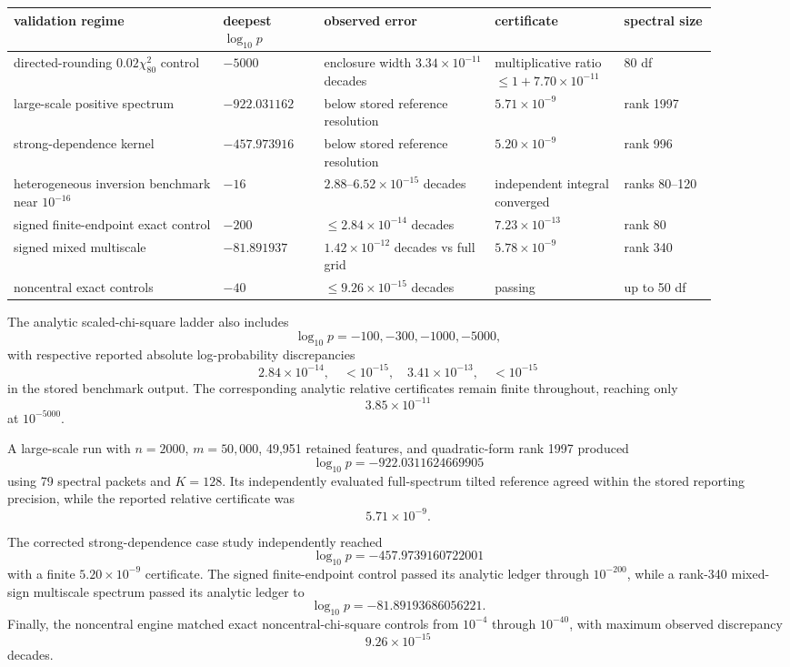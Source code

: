 \begin{center}
\small
\begin{tabular}{@{}P{0.27\linewidth}P{0.13\linewidth}P{0.22\linewidth}P{0.16\linewidth}P{0.12\linewidth}@{}}
\toprule
validation regime & deepest $\log_{10}p$ & observed error & certificate & spectral size\\
\midrule
directed-rounding $0.02\chi^2_{80}$ control
& $-5000$ & enclosure width $3.34\times10^{-11}$ decades
& multiplicative ratio $\le 1+7.70\times10^{-11}$ & 80 df\\
large-scale positive spectrum
& $-922.031162$ & below stored reference resolution & $5.71\times10^{-9}$ & rank 1997\\
strong-dependence kernel
& $-457.973916$ & below stored reference resolution & $5.20\times10^{-9}$ & rank 996\\
heterogeneous inversion benchmark near $10^{-16}$
& $-16$ & $2.88$--$6.52\times10^{-15}$ decades & independent integral converged & ranks 80--120\\
signed finite-endpoint exact control
& $-200$ & $\le 2.84\times10^{-14}$ decades & $7.23\times10^{-13}$ & rank 80\\
signed mixed multiscale
& $-81.891937$ & $1.42\times10^{-12}$ decades vs full grid & $5.78\times10^{-9}$ & rank 340\\
noncentral exact controls
& $-40$ & $\le 9.26\times10^{-15}$ decades & passing & up to 50 df\\
\bottomrule
\end{tabular}
\end{center}

The analytic scaled-chi-square ladder also includes
\[
\log_{10}p=-100,-300,-1000,-5000,
\]
with respective reported absolute log-probability discrepancies
\[
2.84\times10^{-14},\quad
<10^{-15},\quad
3.41\times10^{-13},\quad
<10^{-15}
\]
in the stored benchmark output.  The corresponding analytic relative certificates
remain finite throughout, reaching only
\[
3.85\times10^{-11}
\]
at \(10^{-5000}\).

A large-scale run with \(n=2000\), \(m=50{,}000\), 49,951 retained
features, and quadratic-form rank 1997 produced
\[
\boxed{\log_{10}p=-922.0311624669905}
\]
using 79 spectral packets and \(K=128\).  Its independently evaluated
full-spectrum tilted reference agreed within the stored reporting precision, while the
reported relative certificate was
\[
5.71\times10^{-9}.
\]

The corrected strong-dependence case study independently reached
\[
\boxed{\log_{10}p=-457.9739160722001}
\]
with a finite \(5.20\times10^{-9}\) certificate.  The signed finite-endpoint
control passed its analytic ledger through \(10^{-200}\), while a rank-340 mixed-sign
multiscale spectrum passed its analytic ledger to
\[
\boxed{\log_{10}p=-81.89193686056221}.
\]
Finally, the noncentral engine matched exact noncentral-chi-square controls
from \(10^{-4}\) through \(10^{-40}\), with maximum observed discrepancy
\[
9.26\times10^{-15}
\]
decades.


